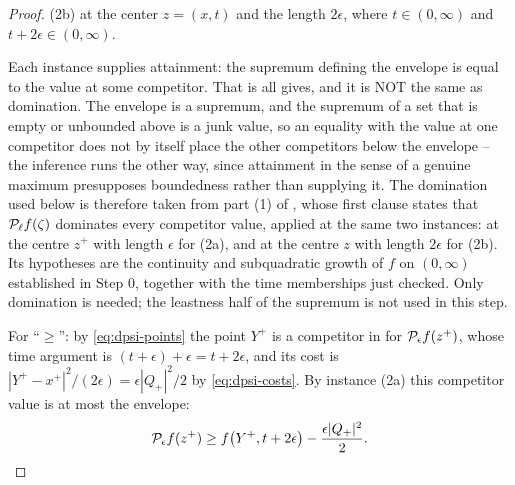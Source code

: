 \begin{proof}
(2b) at the center $z=(x,t)$ and the length $2\epsilon$, where $t\in(0,\infty)$
and $t+2\epsilon\in(0,\infty)$.

Each instance supplies attainment: the supremum defining the envelope is equal
to the value at some competitor. That is all  gives,
and it is NOT the same as domination. The envelope is a supremum, and the
supremum of a set that is empty or unbounded above is a junk value, so an
equality with the value at one competitor does not by itself place the other
competitors below the envelope -- the inference runs the other way, since
attainment in the sense of a genuine maximum presupposes boundedness rather
than supplying it. The domination used below is therefore taken from part (1)
of , whose first clause states that
$\mathcal{P}_\ell f(\zeta)$ dominates every competitor value, applied at the same two
instances: at the centre $z^+$ with length $\epsilon$ for (2a), and at the
centre $z$ with length $2\epsilon$ for (2b). Its hypotheses are the continuity
and subquadratic growth of $f$ on $(0,\infty)$ established in Step 0, together
with the time memberships just checked. Only domination is needed; the
leastness half of the supremum is not used in this step.

For ``$\ge$'': by \eqref{eq:dpsi-points} the point $Y^+$ is a competitor in
 for $\mathcal{P}_\epsilon f(z^+)$, whose time argument is
$(t+\epsilon)+\epsilon=t+2\epsilon$, and its cost is
$|Y^+-x^+|^2/(2\epsilon)=\epsilon|Q_+|^2/2$ by \eqref{eq:dpsi-costs}. By
instance (2a) this competitor value is at most the envelope:
\begin{equation}\label{eq:dpsi-fwd-ge}
  \mathcal{P}_\epsilon f(z^+)\ge f\bigl(Y^+,t+2\epsilon\bigr)
    -\frac{\epsilon|Q_+|^2}{2}.
\end{equation}


\end{proof}
